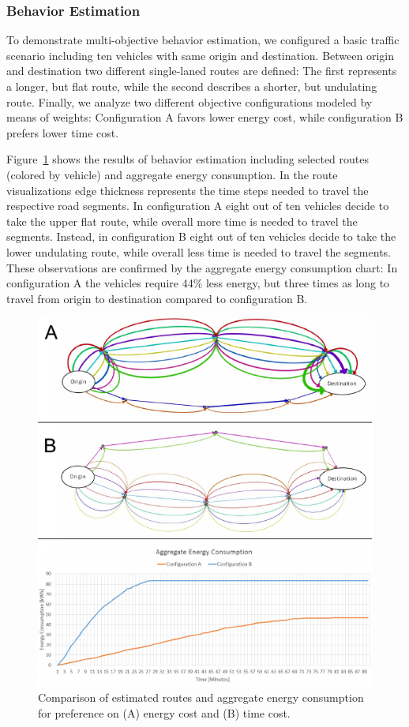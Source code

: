 \documentclass[conference]{../cls/IEEEtran}
\begin{document}
\subsubsection*{Behavior Estimation}

To demonstrate multi-objective behavior estimation, we configured a basic
traffic scenario including ten vehicles with same origin and destination.
Between origin and destination two different single-laned routes are defined:
The first represents a longer, but flat route, while the second describes a shorter, but undulating route. Finally, we analyze two different objective configurations modeled by means of weights: Configuration A favors lower energy cost, while configuration B prefers lower time cost.

Figure~\ref{figure:results} shows the results of behavior estimation including
selected routes (colored by vehicle) and aggregate energy consumption. In the route visualizations edge thickness represents the time steps needed to travel the respective road segments. In configuration A eight out of ten vehicles decide to take the upper flat route, while overall more time is needed to travel the segments. Instead, in configuration B eight out of ten vehicles decide to take the lower undulating route, while overall less time is needed to travel the segments. These observations are confirmed by the aggregate energy consumption chart: In configuration A the vehicles require 44\% less energy, but three times as long to travel from origin to destination compared to configuration B.

\begin{figure}[t!]
	\includegraphics[width=\columnwidth]{../gfx/results.pdf}
	\caption{Comparison of estimated routes and aggregate energy consumption for preference  on (A) energy cost and (B) time cost.}
	\label{figure:results}
\end{figure}
\end{document}
